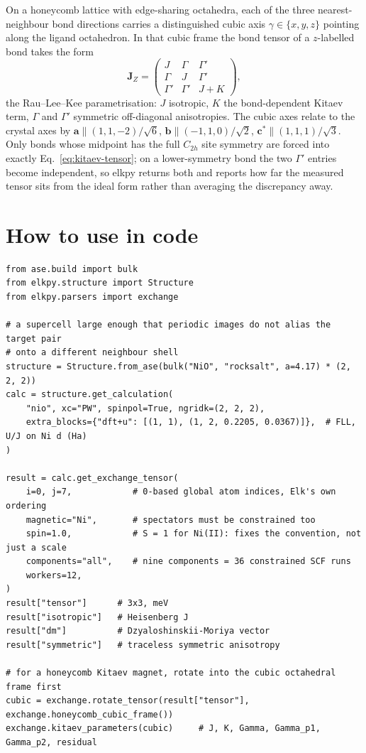 \documentclass[11pt]{article}
\begin{document}
On a honeycomb lattice with edge-sharing octahedra, each of the three
nearest-neighbour bond directions carries a distinguished cubic axis
$\gamma\in\{x,y,z\}$ pointing along the ligand octahedron. In that cubic frame
the bond tensor of a $z$-labelled bond takes the form
\begin{equation}
  \mathbf J_{Z}=\begin{pmatrix}
    J & \Gamma & \Gamma'\\
    \Gamma & J & \Gamma'\\
    \Gamma' & \Gamma' & J+K
  \end{pmatrix},
  \label{eq:kitaev-tensor}
\end{equation}
the Rau--Lee--Kee parametrisation: $J$ isotropic, $K$ the bond-dependent Kitaev
term, $\Gamma$ and $\Gamma'$ symmetric off-diagonal anisotropies. The cubic axes
relate to the crystal axes by
$\mathbf a\parallel(1,1,-2)/\sqrt6$, $\mathbf b\parallel(-1,1,0)/\sqrt2$,
$\mathbf c^*\parallel(1,1,1)/\sqrt3$. Only bonds whose midpoint has the full
$C_{2h}$ site symmetry are forced into exactly Eq.~\eqref{eq:kitaev-tensor}; on
a lower-symmetry bond the two $\Gamma'$ entries become independent, so elkpy
returns both and reports how far the measured tensor sits from the ideal form
rather than averaging the discrepancy away.

\section{How to use in code}

\begin{verbatim}
from ase.build import bulk
from elkpy.structure import Structure
from elkpy.parsers import exchange

# a supercell large enough that periodic images do not alias the target pair
# onto a different neighbour shell
structure = Structure.from_ase(bulk("NiO", "rocksalt", a=4.17) * (2, 2, 2))
calc = structure.get_calculation(
    "nio", xc="PW", spinpol=True, ngridk=(2, 2, 2),
    extra_blocks={"dft+u": [(1, 1), (1, 2, 0.2205, 0.0367)]},  # FLL, U/J on Ni d (Ha)
)

result = calc.get_exchange_tensor(
    i=0, j=7,            # 0-based global atom indices, Elk's own ordering
    magnetic="Ni",       # spectators must be constrained too
    spin=1.0,            # S = 1 for Ni(II): fixes the convention, not just a scale
    components="all",    # nine components = 36 constrained SCF runs
    workers=12,
)
result["tensor"]      # 3x3, meV
result["isotropic"]   # Heisenberg J
result["dm"]          # Dzyaloshinskii-Moriya vector
result["symmetric"]   # traceless symmetric anisotropy

# for a honeycomb Kitaev magnet, rotate into the cubic octahedral frame first
cubic = exchange.rotate_tensor(result["tensor"], exchange.honeycomb_cubic_frame())
exchange.kitaev_parameters(cubic)     # J, K, Gamma, Gamma_p1, Gamma_p2, residual
\end{verbatim}
\end{document}
